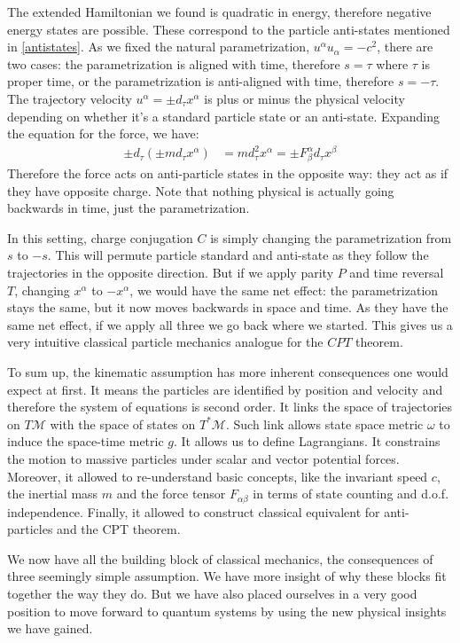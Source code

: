 \documentclass[aps,pra,10pt,twocolumn,floatfix,nofootinbib]{revtex4-1}
\numberwithin{equation}{section}
\theoremstyle{definition}
\begin{document}
The extended Hamiltonian we found is quadratic in energy, therefore negative energy states are possible. These correspond to the particle anti-states mentioned in \ref{antistates}. As we fixed the natural parametrization, $u^\alpha u_\alpha = - c^2$, there are two cases: the parametrization is aligned with time, therefore $s=\tau$ where $\tau$ is proper time, or the parametrization is anti-aligned with time, therefore $s=-\tau$. The trajectory velocity $u^\alpha= \pm d_\tau x^\alpha$ is plus or minus the physical velocity depending on whether it's a standard particle state or an anti-state. Expanding the equation for the force, we have:
\begin{align*}
\pm d_\tau (\pm m d_\tau x^\alpha) &= m d_\tau^2 x^\alpha = \pm  F^\alpha_\beta d_\tau x^\beta
\end{align*}
Therefore the force acts on anti-particle states in the opposite way: they act as if they have opposite charge. Note that nothing physical is actually going backwards in time, just the parametrization.

In this setting, charge conjugation $C$ is simply changing the parametrization from $s$ to $-s$. This will permute particle standard and anti-state as they follow the trajectories in the opposite direction. But if we apply parity $P$ and time reversal $T$, changing $x^\alpha$ to $-x^\alpha$, we would have the same net effect: the parametrization stays the same, but it now moves backwards in space and time. As they have the same net effect, if we apply all three we go back where we started. This gives us a very intuitive classical particle mechanics analogue for the $CPT$ theorem.

To sum up, the kinematic assumption has more inherent consequences one would expect at first. It means the particles are identified by position and velocity and therefore the system of equations is second order. It links the space of trajectories on $T\mathcal{M}$ with the space of states on $T^*\mathcal{M}$. Such link allows state space metric $\omega$ to induce the space-time metric $g$. It allows us to define Lagrangians. It constrains the motion to massive particles under scalar and vector potential forces. Moreover, it allowed to re-understand basic concepts, like the invariant speed $c$, the inertial mass $m$ and the force tensor $F_{\alpha\beta}$ in terms of state counting and d.o.f. independence. Finally, it allowed to construct classical equivalent for anti-particles and the CPT theorem.

We now have all the building block of classical mechanics, the consequences of three seemingly simple assumption. We have more insight of why these blocks fit together the way they do. But we have also placed ourselves in a very good position to move forward to quantum systems by using the new physical insights we have gained.
\end{document}
